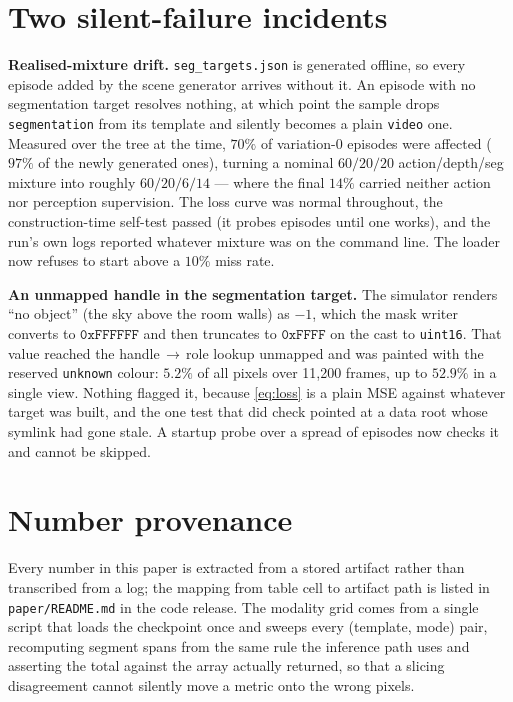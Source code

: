 \documentclass{article} %
\newcommand{\tmpl}[1]{\texttt{#1}}
\begin{document}
\section{Two silent-failure incidents}
\label{app:incidents}

\textbf{Realised-mixture drift.} \texttt{seg\_targets.json} is generated offline, so every episode
added by the scene generator arrives without it. An episode with no segmentation target resolves
nothing, at which point the sample drops \texttt{segmentation} from its template and silently
becomes a plain \tmpl{video} one. Measured over the tree at the time, $70\%$ of variation-0
episodes were affected ($97\%$ of the newly generated ones), turning a nominal $60/20/20$
action/depth/seg mixture into roughly $60/20/6/14$ --- where the final $14\%$ carried neither
action nor perception supervision. The loss curve was normal throughout, the construction-time
self-test passed (it probes episodes until one works), and the run's own logs reported whatever
mixture was on the command line. The loader now refuses to start above a $10\%$ miss rate.

\textbf{An unmapped handle in the segmentation target.} The simulator renders ``no object'' (the
sky above the room walls) as $-1$, which the mask writer converts to $\mathtt{0xFFFFFF}$ and then
truncates to $\mathtt{0xFFFF}$ on the cast to \texttt{uint16}. That value reached the
handle$\,\to\,$role lookup unmapped and was painted with the reserved \texttt{unknown} colour:
$5.2\%$ of all pixels over 11{,}200 frames, up to $52.9\%$ in a single view. Nothing flagged it,
because \eqref{eq:loss} is a plain MSE against whatever target was built, and the one test that
did check pointed at a data root whose symlink had gone stale. A startup probe over a spread of
episodes now checks it and cannot be skipped.

\section{Number provenance}

Every number in this paper is extracted from a stored artifact rather than transcribed from a log;
the mapping from table cell to artifact path is listed in \texttt{paper/README.md} in the code
release. The modality grid comes from a single script that loads the checkpoint once and sweeps
every (template, mode) pair, recomputing segment spans from the same rule the inference path uses
and asserting the total against the array actually returned, so that a slicing disagreement cannot
silently move a metric onto the wrong pixels.
\end{document}
